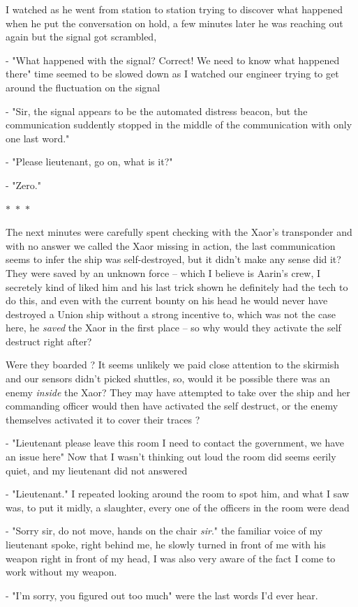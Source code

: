 \documentclass[colorlinks,12pt,a4paper]{book}
\newcommand\sep{\begin{center}
  \boldmath $\ast$~$\ast$~$\ast$
\end{center}}
\begin{document}
I watched as he went from station to station trying to discover what happened when he put the conversation on hold, 
a few minutes later he was reaching out again but the signal got scrambled,\par 
\bigskip
- "What happened with the signal? Correct! We need to know what happened there" time seemed to be slowed down as I watched 
our engineer trying to get around the fluctuation on the signal\par 
- "Sir, the signal appears to be the automated distress beacon, but the communication suddently stopped in the middle of the 
communication with only one last word."\par 
- "Please lieutenant, go on, what is it?"\par 
- "Zero."\par 
\bigskip

\sep 

The next minutes were carefully spent checking with the Xaor's transponder and with no answer we called the Xaor missing in action, 
the last communication seems to infer the ship was self-destroyed, but it didn't make any sense did it? They were saved by an 
unknown force -- which I believe is Aarin's crew, I secretely kind of liked him and his last trick shown he definitely had the tech to do this, 
and even with the current bounty on his head he would never have destroyed a Union ship without a strong incentive to, which 
was not the case here, he \textit{saved} the Xaor in the first place -- so why would they activate the self destruct right after?\par\bigskip

Were they boarded ? It seems unlikely we paid close attention to the skirmish and our sensors didn't picked shuttles, so,
would it be possible there was an enemy \textit{inside} the Xaor? They may have attempted to take over the ship and her commanding 
officer would then have activated the self destruct, or the enemy themselves activated it to cover their traces ?\par 
\bigskip 

- "Lieutenant please leave this room I need to contact the government, we have an issue here" Now that I wasn't thinking out loud the 
room did seems eerily quiet, and my lieutenant did not answered\newline\par
- "Lieutenant." I repeated looking around the room to spot him, and what I saw was, to put it midly, a slaughter, every one of the officers
in the room were dead\newline\par
- "Sorry sir, do not move, hands on the chair \textit{sir}." the familiar voice of my lieutenant spoke, right behind me, he slowly turned in front of me 
with his weapon right in front of my head, I was also very aware of the fact I come to work without my weapon.\newline\par
- "I'm sorry, you figured out too much" were the last words I'd ever hear. 
\end{document}
